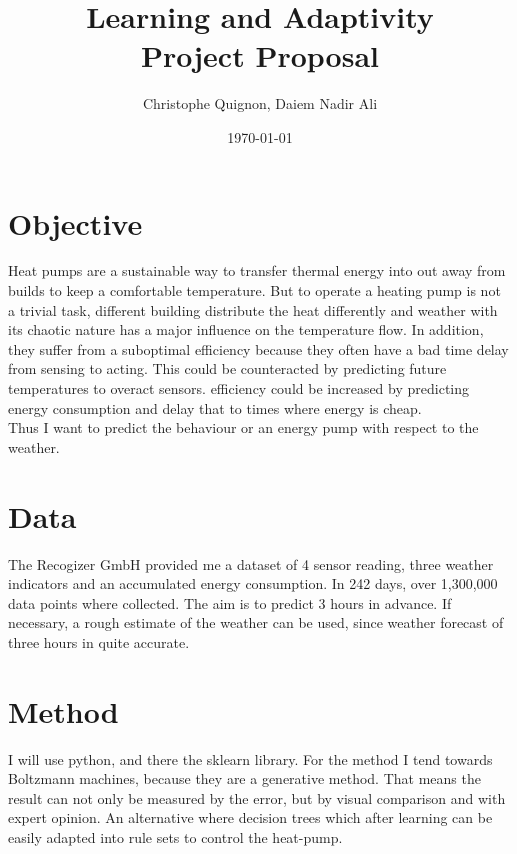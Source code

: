 \documentclass[	DIV=calc,%
				paper=a4,%
				fontsize=11pt,%
				twocolumn]{scrartcl}	 %
\title{Learning and Adaptivity
\\ Project Proposal}%
\author{Christophe Quignon, Daiem Nadir Ali }	%
\date{\today}
\begin{document}
\maketitle
\thispagestyle{fancy} %
\section{Objective}
Heat pumps are a sustainable way to transfer thermal energy into out away from builds to keep a comfortable temperature. But to operate a heating pump is not a trivial task, different building distribute the heat differently and weather with its chaotic nature has a major influence on the temperature flow. In addition, they suffer from a suboptimal efficiency because they often have a bad time delay from sensing to acting. This could be counteracted by predicting future temperatures to overact sensors. efficiency could be increased by predicting energy consumption and delay that to times where energy is cheap.\\
Thus I want to predict the behaviour or an energy pump with respect to the weather.

\section{Data}
The Recogizer GmbH provided me a dataset of 4 sensor reading, three weather indicators and an accumulated energy consumption. In 242 days, over 1,300,000 data points where collected. The aim is to predict 3 hours in advance. If necessary, a rough estimate of the weather can be used, since weather forecast of three hours in quite accurate.


\section{Method}
I will use python, and there the sklearn library.
For the method I tend towards Boltzmann machines, because they are a generative method. That means the result can not only be measured by the error, but by visual comparison and with expert opinion.
An alternative where decision trees which after learning can be easily adapted into rule sets to control the heat-pump.
\end{document}
